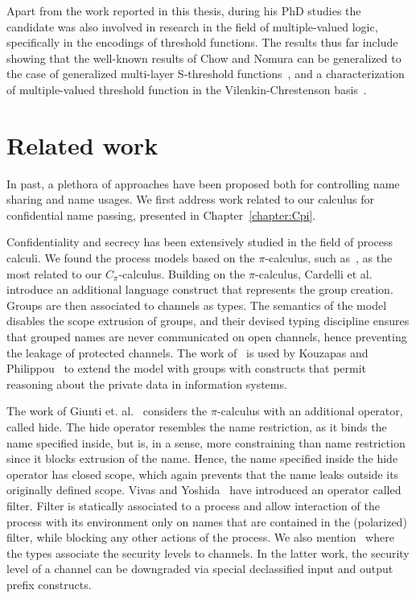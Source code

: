 Apart from the work reported in this thesis, during his PhD studies the candidate was also involved in research in the field of multiple-valued logic, specifically in the encodings of threshold functions. The results thus far include showing that the well-known results of Chow and Nomura can be generalized to the case of generalized multi-layer S-threshold functions~\cite{ProkicPantovic19, DBLP:conf/ismvl/ProkicP17}, and a characterization of multiple-valued threshold function in the Vilenkin-Chrestenson basis~\cite{DBLP:conf/ismvl/Prokic18, Prokic20}. 

\section{Related work}

In past, a plethora of approaches have been proposed both for controlling name sharing and name usages. We first address work related to our calculus for confidential name passing, presented in Chapter~\ref{chapter:Cpi}.

Confidentiality and secrecy has been extensively studied in the field of process calculi. 
We found the process models based on the $\pi$-calculus, such as~\cite{cardelli05,crafa07, Giunti, hennessy05, DBLP:journals/lmcs/KouzapasP17,  vivas02}, as the most related to our $C_\pi$-calculus.
Building on the $\pi$-calculus, Cardelli et al.~\cite{cardelli05} introduce an additional language construct that represents the
group creation. Groups are then associated to channels as types. The semantics of the model disables the scope extrusion of groups, and their devised typing discipline ensures that grouped names are never communicated on open channels,  
hence preventing the leakage of protected channels. 
The work of~\cite{cardelli05} is used by Kouzapas and Philippou~\cite{DBLP:journals/lmcs/KouzapasP17} to extend 
the model with groups with constructs that permit reasoning about the private 
data in information systems.

The work of Giunti et. al.~\cite{Giunti} considers the $\pi$-calculus with an additional operator, called hide. The hide operator resembles the name restriction, as it binds the name specified inside, but is, in a sense, more constraining than name restriction since it blocks extrusion of the name. Hence, the name specified inside the hide operator has closed scope, which again prevents that the name leaks outside its originally defined scope.
Vivas and Yoshida~\cite{vivas02} have introduced an operator called filter.  Filter  
is statically associated to a process and allow interaction of the process with its environment only on names that are contained in the (polarized) filter, while blocking any other actions of the process. 
We also mention~\cite{crafa07, hennessy05} where the types associate the 
security levels to channels. In the latter work, the security level of a channel
can be downgraded via special declassified 
input and output prefix constructs. 

